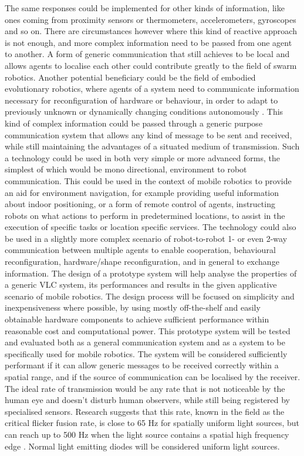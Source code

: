 The same responses could be implemented for other kinds of information, like ones coming from proximity sensors or thermometers, accelerometers, gyroscopes and so on.
There are circumstances however where this kind of reactive approach is not enough, and more complex information need to be passed from one agent to another.
A form of generic communication that still achieves to be local and allows agents to localise each other could contribute greatly to the field of swarm robotics.
Another potential beneficiary could be the field of embodied evolutionary robotics, where agents of a system need to communicate information necessary for reconfiguration of hardware or behaviour, in order to adapt to previously unknown or dynamically changing conditions autonomously \cite{embodiedevolution}.
This kind of complex information could be passed through a generic purpose communication system that allows any kind of message to be sent and received, while still maintaining the advantages of a situated medium of transmission.
Such a technology could be used in both very simple or more advanced forms, the simplest of which would be mono directional, environment to robot communication.
This could be used in the context of mobile robotics to provide an aid for environment navigation, for example providing useful information about indoor positioning,
or a form of remote control of agents, instructing robots on what actions to perform in predetermined locations, to assist in the execution of specific tasks or location specific services. 
The technology could also be used in a slightly more complex scenario of robot-to-robot 1- or even 2-way communication between multiple agents to enable cooperation, behavioural reconfiguration, hardware/shape reconfiguration, and in general to exchange information.
\newline
The design of a prototype system will help analyse the properties of a generic VLC system, its performances and results in the given applicative scenario of mobile robotics.
The design process will be focused on simplicity and inexpensiveness where possible, by using mostly off-the-shelf and easily obtainable hardware components to achieve sufficient performance within reasonable cost and computational power.
This prototype system will be tested and evaluated both as a general communication system and as a system to be specifically used for mobile robotics.
The system will be considered sufficiently performant if it can allow generic messages to be received correctly within a spatial range, and if the source of communication can be localised by the receiver.
The ideal rate of transmission would be any rate that is not noticeable by the human eye and doesn't disturb human observers, while still being registered by specialised sensors.
Research suggests that this rate, known in the field as the critical flicker fusion rate, is close to 65 Hz for spatially uniform light sources, but can reach up to 500 Hz when the light source contains a spatial high frequency edge \cite{eye}.
Normal light emitting diodes will be considered uniform light sources.

